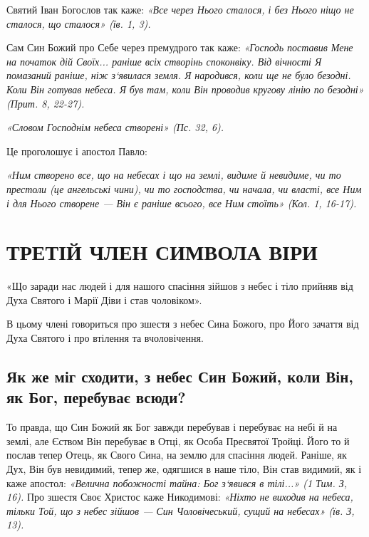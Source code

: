 \documentclass[main.tex]{subfiles}
\begin{document}
Святий Іван Богослов так каже: \emph{«Все через Нього сталося, і без Нього ніщо не сталося, що сталося» (їв. 1, 3).}

Сам Син Божий про Себе через премудрого так каже: \emph{{\color{red} «Господь поставив Мене на початок дій Своїх... раніше всіх створінь споконвіку. Від вічності Я помазаний раніше, ніж з`явилася земля. Я народився, коли ще не було безодні. Коли Він готував небеса. Я був там, коли Він проводив кругову лінію по безодні»} (Прит. 8, 22-27).}
\begin{FlushRight}
   \emph{«Словом Господнім небеса створені» (Пс. 32, 6).} 
\end{FlushRight}

Це проголошує і апостол Павло:

\begin{FlushRight}
    \emph{«Ним створено все, що на небесах і що на землі, видиме й невидиме, чи то престоли (це ангельські чини), чи то господства, чи начала, чи власті, все Ним і для Нього створене — Він є раніше всього, все Ним стоїть» (Кол. 1, 16-17).} 
\end{FlushRight}

\section{ТРЕТІЙ ЧЛЕН СИМВОЛА ВІРИ}
\begin{FlushRight}
    «Що заради нас людей і для нашого спасіння зійшов з небес і тіло прийняв від Духа Святого і Марії Діви і став чоловіком».
\end{FlushRight}

В цьому члені говориться про зшестя з небес Сина Божого, про Його зачаття від Духа Святого і про втілення та вчоловічення.

\subsection{Як же міг сходити, з небес Син Божий, коли Він, як Бог, перебуває всюди?}

То правда, що Син Божий як Бог завжди перебував і перебуває на небі й на землі, але Єством Він перебуває в Отці, як Особа Пресвятої Тройці. Його то й послав тепер Отець, як Свого Сина, на землю для спасіння людей. Раніше, як Дух, Він був невидимий, тепер же, одягшися в наше тіло, Він став видимий, як і каже апостол: \emph{«Велична побожності тайна: Бог з`явився в тілі...» (1 Тим. З, 16).}
Про зшестя Своє Христос каже Никодимові: \emph{{\color{red} «Ніхто не виходив на небеса, тільки Той, що з небес зійшов — Син Чоловічеський, сущий на небесах»} (їв. З, 13).}
\end{document}

